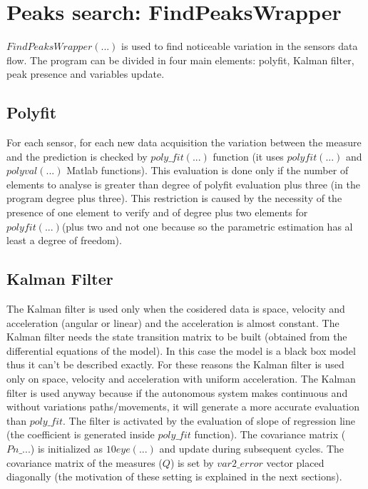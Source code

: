 \documentclass[journal]{IEEEtran}
\begin{document}
\section{Peaks search: FindPeaksWrapper}

$FindPeaksWrapper(...)$ is used to find noticeable variation in the sensors data flow.
The program can be divided in four main elements: polyfit, Kalman filter, peak presence
and variables update.

\subsection{Polyfit}
For each sensor, for each new data acquisition the variation between the measure and the prediction is checked by $poly\_fit(...)$ function (it uses $polyfit(...)$ and $polyval(...)$ Matlab functions). This evaluation is done only if the number of elements to analyse is greater than degree of polyfit evaluation plus three (in the program degree plus three). This restriction is caused by the necessity of the presence of one element to verify and of degree plus two elements for $polyfit(...)$(plus two and not one because so the parametric estimation has al least a degree of freedom).

\subsection{Kalman Filter}
The Kalman filter is used only when the cosidered data is space, velocity and acceleration (angular or linear) and the acceleration is almost constant.
The Kalman filter needs the state transition matrix to be built (obtained from the differential equations of the model). In this case the model is a black box model thus it can't be described exactly. For these reasons the Kalman filter is used only on space, velocity and acceleration with uniform acceleration.
The Kalman filter is used anyway because if the autonomous system makes continuous and without variations paths/movements, it will generate a more accurate evaluation than $poly\_fit$.
The filter is activated by the evaluation of slope of regression line (the coefficient is generated inside $poly\_fit$ function).
The covariance matrix ($Pn\_...$) is initialized as $10$\hspace{1mm}$eye(...)$ and update during subsequent cycles.
The covariance matrix of the measures ($Q$) is set by $var2\_error$ vector placed diagonally (the motivation of these setting is explained in the next sections).
\end{document}
